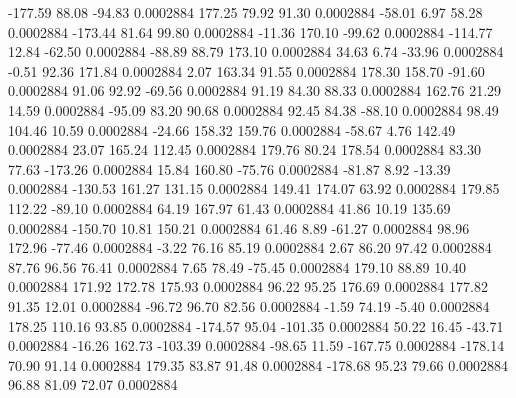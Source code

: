      -177.59       88.08      -94.83     0.0002884
      177.25       79.92       91.30     0.0002884
      -58.01        6.97       58.28     0.0002884
     -173.44       81.64       99.80     0.0002884
      -11.36      170.10      -99.62     0.0002884
     -114.77       12.84      -62.50     0.0002884
      -88.89       88.79      173.10     0.0002884
       34.63        6.74      -33.96     0.0002884
       -0.51       92.36      171.84     0.0002884
        2.07      163.34       91.55     0.0002884
      178.30      158.70      -91.60     0.0002884
       91.06       92.92      -69.56     0.0002884
       91.19       84.30       88.33     0.0002884
      162.76       21.29       14.59     0.0002884
      -95.09       83.20       90.68     0.0002884
       92.45       84.38      -88.10     0.0002884
       98.49      104.46       10.59     0.0002884
      -24.66      158.32      159.76     0.0002884
      -58.67        4.76      142.49     0.0002884
       23.07      165.24      112.45     0.0002884
      179.76       80.24      178.54     0.0002884
       83.30       77.63     -173.26     0.0002884
       15.84      160.80      -75.76     0.0002884
      -81.87        8.92      -13.39     0.0002884
     -130.53      161.27      131.15     0.0002884
      149.41      174.07       63.92     0.0002884
      179.85      112.22      -89.10     0.0002884
       64.19      167.97       61.43     0.0002884
       41.86       10.19      135.69     0.0002884
     -150.70       10.81      150.21     0.0002884
       61.46        8.89      -61.27     0.0002884
       98.96      172.96      -77.46     0.0002884
       -3.22       76.16       85.19     0.0002884
        2.67       86.20       97.42     0.0002884
       87.76       96.56       76.41     0.0002884
        7.65       78.49      -75.45     0.0002884
      179.10       88.89       10.40     0.0002884
      171.92      172.78      175.93     0.0002884
       96.22       95.25      176.69     0.0002884
      177.82       91.35       12.01     0.0002884
      -96.72       96.70       82.56     0.0002884
       -1.59       74.19       -5.40     0.0002884
      178.25      110.16       93.85     0.0002884
     -174.57       95.04     -101.35     0.0002884
       50.22       16.45      -43.71     0.0002884
      -16.26      162.73     -103.39     0.0002884
      -98.65       11.59     -167.75     0.0002884
     -178.14       70.90       91.14     0.0002884
      179.35       83.87       91.48     0.0002884
     -178.68       95.23       79.66     0.0002884
       96.88       81.09       72.07     0.0002884
